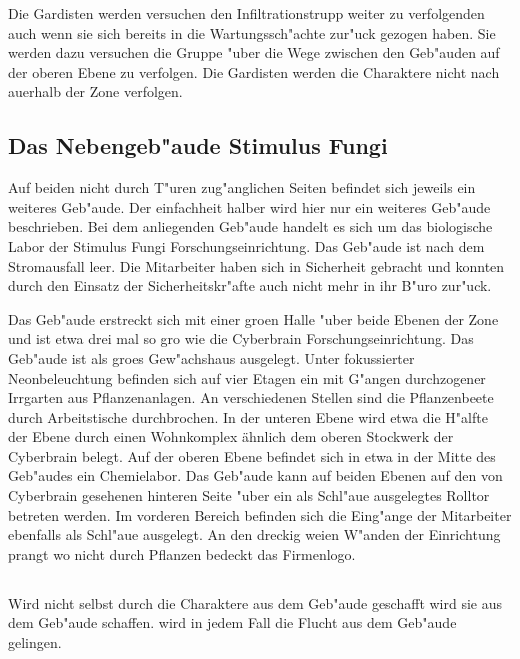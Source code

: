 Die Gardisten werden versuchen den Infiltrationstrupp weiter zu verfolgenden auch wenn sie sich bereits in die Wartungssch"achte zur"uck gezogen haben. Sie werden dazu versuchen die Gruppe "uber die Wege zwischen den Geb"auden auf der oberen Ebene zu verfolgen. Die Gardisten werden die Charaktere nicht nach au\3erhalb der Zone verfolgen.

\subsection{Das Nebengeb"aude Stimulus Fungi} 
Auf beiden nicht durch T"uren zug"anglichen Seiten befindet sich jeweils ein weiteres Geb"aude. Der einfachheit halber wird hier nur ein weiteres Geb"aude beschrieben. Bei dem anliegenden Geb"aude handelt es sich um das biologische Labor der Stimulus Fungi Forschungseinrichtung. Das Geb"aude ist nach dem Stromausfall leer. Die Mitarbeiter haben sich in Sicherheit gebracht und konnten durch den Einsatz der Sicherheitskr"afte auch nicht mehr in ihr B"uro zur"uck. 

Das Geb"aude erstreckt sich mit einer gro\3en Halle "uber beide Ebenen der Zone und ist etwa drei mal so gro\3 wie die Cyberbrain Forschungseinrichtung. Das Geb"aude ist als gro\3es Gew"achshaus ausgelegt. Unter fokussierter Neonbeleuchtung befinden sich auf vier Etagen ein mit G"angen durchzogener Irrgarten aus Pflanzenanlagen. An verschiedenen Stellen sind die Pflanzenbeete durch Arbeitstische durchbrochen. In der unteren Ebene wird etwa die H"alfte der Ebene durch einen Wohnkomplex ähnlich dem oberen Stockwerk der Cyberbrain belegt. Auf der oberen Ebene befindet sich in etwa in der Mitte des Geb"audes ein Chemielabor. Das Geb"aude kann auf beiden Ebenen auf den von Cyberbrain gesehenen hinteren Seite "uber ein als Schl"au\3e ausgelegtes Rolltor betreten werden. Im vorderen Bereich befinden sich die Eing"ange der Mitarbeiter ebenfalls als Schl"au\3e ausgelegt. An den dreckig wei\3en W"anden der Einrichtung prangt wo nicht durch Pflanzen bedeckt das Firmenlogo.

\subsection{\ml{}} 
Wird \ml{} nicht selbst durch die Charaktere aus dem Geb"aude geschafft wird \xl{} sie aus dem Geb"aude schaffen. \ml{} wird in jedem Fall die Flucht aus dem Geb"aude gelingen.

